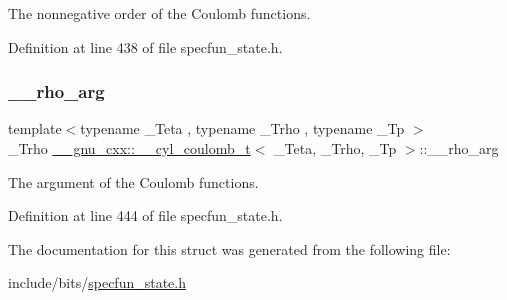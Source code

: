 The nonnegative order of the Coulomb functions. 



Definition at line 438 of file specfun\+\_\+state.\+h.

\mbox{\label{struct____gnu__cxx_1_1____cyl__coulomb__t_abbff84a3b281ef7fc6f16245c02b695d}} 
\subsubsection{\texorpdfstring{\+\_\+\+\_\+rho\+\_\+arg}{\_\_rho\_arg}}
{\footnotesize\ttfamily template$<$typename \+\_\+\+Teta , typename \+\_\+\+Trho , typename \+\_\+\+Tp $>$ \\
\+\_\+\+Trho \hyperlink{struct____gnu__cxx_1_1____cyl__coulomb__t}{\+\_\+\+\_\+gnu\+\_\+cxx\+::\+\_\+\+\_\+cyl\+\_\+coulomb\+\_\+t}$<$ \+\_\+\+Teta, \+\_\+\+Trho, \+\_\+\+Tp $>$\+::\+\_\+\+\_\+rho\+\_\+arg}



The argument of the Coulomb functions. 



Definition at line 444 of file specfun\+\_\+state.\+h.



The documentation for this struct was generated from the following file\+:\begin{DoxyCompactItemize}
\item 
include/bits/\hyperlink{specfun__state_8h}{specfun\+\_\+state.\+h}\end{DoxyCompactItemize}
